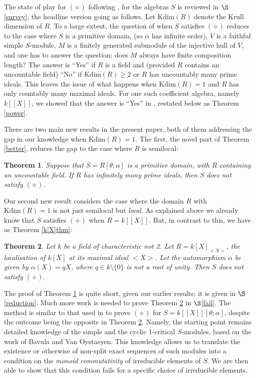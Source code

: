 \documentclass[a4paper, 11pt]{article}
\newtheorem{theorem}{Theorem}[section]
\theoremstyle{definition}
\begin{document}
The state of play for $(\diamond)$ following \cite{BCM}, \cite{BCM2} for the algebras $S$ is reviewed in $\S$\ref{survey}, the headline version going as follows. Let $\mathrm{Kdim}(R)$ denote the Krull dimension of $R$. To a large extent, the question of when $S$ satisfies $(\diamond)$ reduces to the case where $S$ is a primitive domain, (so $\alpha$ has infinite order), $V$ is a faithful simple $S$-module, $M$ is a finitely generated submodule of the injective hull of $V$, and one has to answer the question: does $M$ always have finite composition length? The answer is ``Yes'' if $R$ is a field and (provided $R$ contains an uncountable field) ``No'' if $\mathrm{Kdim}(R) \geq 2$ or $R$ has uncountably many prime ideals. This leaves the issue of what happens when $\mathrm{Kdim}(R)=1$ and $R$ has only countably many maximal ideals. For one such coefficient algebra, namely $k[[X]]$, we showed that the answer is ``Yes'' in \cite[Theorem 1.2]{BCM2}, restated below as Theorem \ref{power}.  

There are two main new results in the present paper, both of them addressing the gap in our knowledge when $\mathrm{Kdim}(R)=1$. The first, the novel part of Theorem \ref{better}, reduces the gap to the case where $R$ is semilocal:

\begin{theorem}\label{firstthm} Suppose that $S= R[\theta; \alpha]$ is a primitive domain, with $R$ containing an uncountable field. If $R$ has infinitely many prime ideals, then $S$ does not satisfy $(\diamond)$.
\end{theorem}

Our second new result considers the case where the domain $R$ with $\mathrm{Kdim}(R)=1$ is not just semilocal but {\it local}. As explained above we already know that $S$ satisfies $(\diamond)$ when $R = k[[X]]$. But, in contrast to this, we have as Theorem \ref{k[X]thm}:

\begin{theorem}\label{secondthm} Let $k$ be a field of characteristic not 2. Let $R = k[X]_{<X>}$, the localisation of $k[X]$ at its maximal ideal $<X>$. Let the automorphism $\alpha$ be given by $\alpha(X) = qX$,  where $q \in k \setminus \{0\}$ is not a root of unity. Then $S$ does not satisfy  $(\diamond)$. 
\end{theorem}

The proof of Theorem \ref{firstthm} is quite short, given our earlier results; it is given in $\S$\ref{reduction}. Much more work is needed to prove Theorem \ref{secondthm} in $\S$\ref{fail}. The method is similar to that used in \cite{BCM2} to prove $(\diamond)$ for $S = k[[X]][\theta; \alpha]$, despite the outcome being the opposite in Theorem \ref{secondthm}. Namely, the starting point remains detailed knowledge of the simple and the cyclic 1-critical $S$-modules, based on the work \cite{BVO} of Bavula and Van Oystaeyen. This knowledge allows us to translate the existence or otherwise of non-split exact sequences of such modules into a condition on the {\it monoid commutativity} of irreducible elements of $S$. We are then able to show that this condition fails for a specific choice of irreducible elements. 
\end{document}
